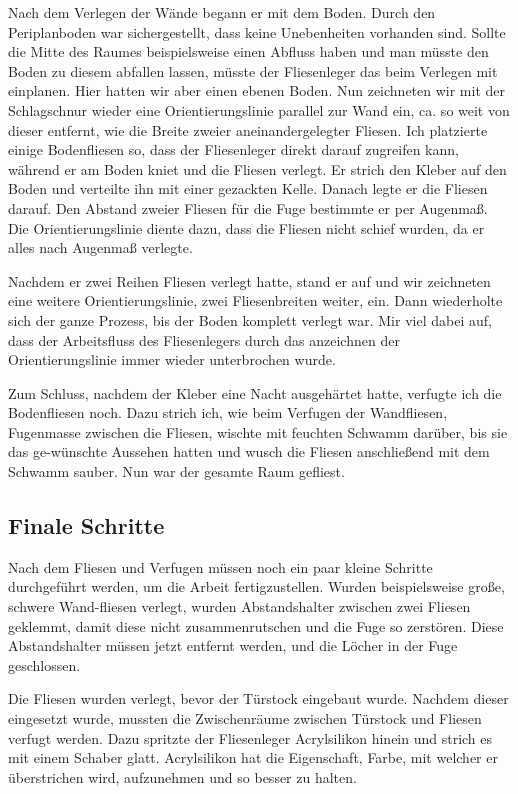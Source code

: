 Nach dem Verlegen der Wände begann er mit dem Boden. Durch den Periplanboden war sichergestellt, dass keine Unebenheiten vorhanden sind. Sollte die Mitte des Raumes beispielsweise einen Abfluss haben und man müsste den Boden zu diesem abfallen lassen, müsste der Fliesenleger das beim Verlegen mit einplanen. Hier hatten wir aber einen ebenen Boden. Nun zeichneten wir mit der Schlagschnur wieder eine Orientierungslinie parallel zur Wand ein, ca. so weit von dieser entfernt, wie die Breite zweier aneinandergelegter Fliesen. Ich platzierte einige Bodenfliesen so, dass der Fliesenleger direkt darauf zugreifen kann, während er am Boden kniet und die Fliesen verlegt. Er strich den Kleber auf den Boden und verteilte ihn mit einer gezackten Kelle. Danach legte er die Fliesen darauf. Den Abstand zweier Fliesen für die Fuge bestimmte er per Augenmaß. Die Orientierungslinie diente dazu, dass die Fliesen nicht schief wurden, da er alles nach Augenmaß verlegte. 

Nachdem er zwei Reihen Fliesen verlegt hatte, stand er auf und wir zeichneten eine weitere Orientierungslinie, zwei Fliesenbreiten weiter, ein. Dann wiederholte sich der ganze Prozess, bis der Boden komplett verlegt war. Mir viel dabei auf, dass der Arbeitsfluss des Fliesenlegers durch das anzeichnen der Orientierungslinie immer wieder unterbrochen wurde. 

Zum Schluss, nachdem der Kleber eine Nacht ausgehärtet hatte, verfugte ich die Bodenfliesen noch. Dazu strich ich, wie beim Verfugen der Wandfliesen, Fugenmasse zwischen die Fliesen, wischte mit feuchten Schwamm darüber, bis sie das ge-wünschte Aussehen hatten und wusch die Fliesen anschließend mit dem Schwamm sauber. Nun war der gesamte Raum gefliest.

\subsection{Finale Schritte}

Nach dem Fliesen und Verfugen müssen noch ein paar kleine Schritte durchgeführt werden, um die Arbeit fertigzustellen. Wurden beispielsweise große, schwere Wand-fliesen verlegt, wurden Abstandshalter zwischen zwei Fliesen geklemmt, damit diese nicht zusammenrutschen und die Fuge so zerstören. Diese Abstandshalter müssen jetzt entfernt werden, und die Löcher in der Fuge geschlossen.

Die Fliesen wurden verlegt, bevor der Türstock eingebaut wurde. Nachdem dieser eingesetzt wurde, mussten die Zwischenräume zwischen Türstock und Fliesen verfugt werden. Dazu spritzte der Fliesenleger Acrylsilikon hinein und strich es mit einem Schaber glatt. Acrylsilikon hat die Eigenschaft, Farbe, mit welcher er überstrichen wird, aufzunehmen und so besser zu halten.

